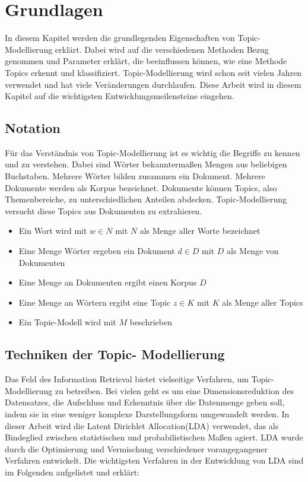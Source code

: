 \documentclass[german,version-2020-11]{uzl-thesis}
\begin{document}
\chapter{Grundlagen}%

In diesem Kapitel werden die grundlegenden Eigenschaften von Topic-Modellierung erklärt. Dabei wird auf die verschiedenen Methoden Bezug genommen und Parameter erklärt, die beeinflussen können, wie eine Methode Topics erkennt und klassifiziert. Topic-Modellierung wird schon seit vielen Jahren verwendet und hat viele Veränderungen durchlaufen. Diese Arbeit wird in diesem Kapitel auf die wichtigsten Entwicklungsmeilensteine eingehen.

\section{Notation}
Für das Verständnis von Topic-Modellierung ist es wichtig die Begriffe zu kennen und zu verstehen. Dabei sind Wörter bekanntermaßen Mengen aus beliebigen Buchstaben. Mehrere Wörter bilden zusammen ein Dokument. Mehrere Dokumente werden als Korpus bezeichnet. Dokumente können Topics, also Themenbereiche, zu unterschiedlichen Anteilen abdecken. Topic-Modellierung versucht diese Topics aus Dokumenten zu extrahieren.

\begin{itemize}
	\item Ein Wort wird mit $w \in N$ mit $N$ als Menge aller Worte bezeichnet
	\item Eine Menge Wörter ergeben ein Dokument $d \in D$ mit $D$ als Menge von Dokumenten
	\item Eine Menge an Dokumenten ergibt einen Korpus $D$
	\item Eine Menge an Wörtern ergibt eine Topic $z \in K$ mit $K$ als Menge aller Topics
	\item Ein Topic-Modell wird mit $M$ beschrieben
\end{itemize}


\section{Techniken der Topic- Modellierung}

Das Feld des Information Retrieval bietet vielseitige Verfahren, um Topic-Modellierung zu betreiben. Bei vielen geht es um eine Dimensionsreduktion des Datensatzes, die Aufschluss und Erkenntnis über die Datenmenge geben soll, indem sie in eine weniger komplexe Darstellungsform umgewandelt werden. In dieser Arbeit wird die Latent Dirichlet Allocation(LDA) verwendet, das als Bindeglied zwischen statistischen und probabilistischen Maßen agiert. LDA wurde durch die Optimierung und Vermischung verschiedener vorangegangener Verfahren entwickelt. Die wichtigsten Verfahren in der Entwicklung von LDA sind im Folgenden aufgelistet und erklärt: 
\end{document}
